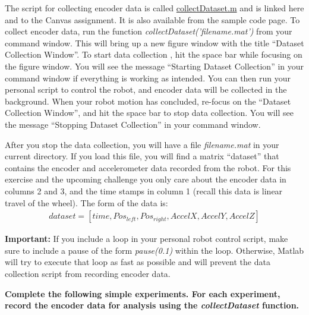 \documentclass{tufte-handout}
\begin{document}
The script for collecting encoder data is called \href{https://drive.google.com/file/d/0B0UHkPLHsgyoTDdPdEd2eXBuU28/view?usp=sharing}{collectDataset.m} and is linked here and to the Canvas assignment. It is also available from the sample code page. To collect encoder data, run the function \emph{collectDataset('filename.mat')} from your command window. This will bring up a new figure window with the title ``Dataset Collection Window''. To start data collection , hit the space bar while focusing on the figure window. You will see the message ``Starting Dataset Collection'' in your command window if everything is working as intended. You can then run your personal script to control the robot, and encoder data will be collected in the background. When your robot motion has concluded, re-focus on the ``Dataset Collection Window'', and hit the space bar to stop data collection. You will see the message  ``Stopping Dataset Collection'' in your command window.

After you stop the data collection, you will have a file \emph{filename.mat} in your current directory. If you load this file, you will find a matrix ``dataset'' that contains the encoder and accelerometer data recorded from the robot. For this exercise and the upcoming challenge you only care about the encoder data in columns 2 and 3, and the time stamps in column 1 (recall this data is linear travel of the wheel). The form of the data is:
\begin{align}
dataset=[ time,Pos_{left},Pos_{right}, AccelX, AccelY, AccelZ]
\end{align}

\textbf{Important:} If you include a loop in your personal robot control script, make sure to include a pause of the form \emph{pause(0.1)} within the loop. Otherwise, Matlab will try to execute that loop as fast as possible and will prevent the data collection script from recording encoder data.



\textbf{Complete the following simple experiments. For each experiment, record the encoder data for analysis using the \emph{collectDataset} function.}
\end{document}
